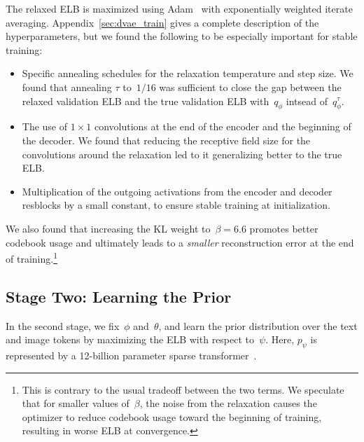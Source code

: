 \documentclass{article}
\newcommand{\given}{\,|\,}{}
\begin{document}



The relaxed ELB is maximized using Adam~\cite{kingma2014adam} with exponentially weighted iterate averaging. Appendix~\ref{sec:dvae_train} gives a complete description of the hyperparameters, but we found the following to be especially important for stable training:
\begin{itemize}
    \item Specific annealing schedules for the relaxation temperature and step size. We found that annealing $\tau$ to~$1 / 16$ was sufficient to close the gap between the relaxed validation ELB and the true validation ELB with~$q_\phi$ intsead of~$q_\phi^\tau$.
    \item The use of $1 \times 1$ convolutions at the end of the encoder and the beginning of the decoder. We found that reducing the receptive field size for the convolutions around the relaxation led to it generalizing better to the true ELB.
    \item Multiplication of the outgoing activations from the encoder and decoder resblocks by a small constant, to ensure stable training at initialization.
\end{itemize}
%
We also found that increasing the KL weight to~$\beta = 6.6$ promotes better codebook usage and ultimately leads to a \emph{smaller} reconstruction error at the end of training.\footnote{This is contrary to the usual tradeoff between the two terms. We speculate that for smaller values of~$\beta$, the noise from the relaxation causes the optimizer to reduce codebook usage toward the beginning of training, resulting in worse ELB at convergence.}
%
\subsection{Stage Two: Learning the Prior}
\label{sec:learning_prior}
%
In the second stage, we fix~$\phi$ and~$\theta$, and learn the prior distribution over the text and image tokens by maximizing the ELB with respect to~$\psi$. Here, $p_\psi$ is represented by a 12-billion parameter sparse transformer~\cite{child2019generating}.
\end{document}
